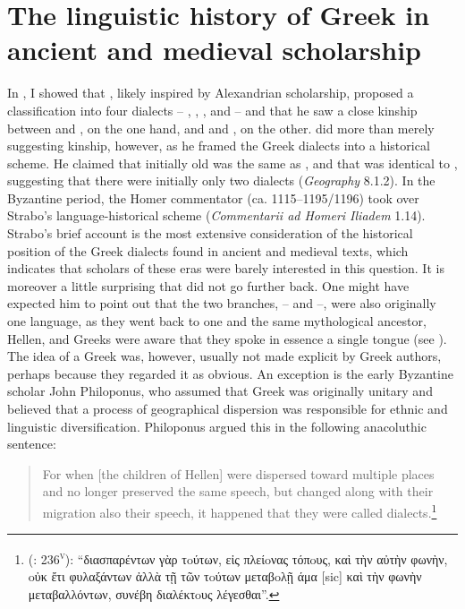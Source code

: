 \section{The linguistic history of Greek in ancient and medieval scholarship}\label{sec:5.1}

In , I showed that , likely inspired by Alexandrian scholarship, proposed a classification into four dialects – , , , and  – and that he saw a close kinship between  and , on the one hand, and  and , on the other.  did more than merely suggesting kinship, however, as he framed the Greek dialects into a historical scheme. He claimed that initially old  was the same as , and that  was identical to , suggesting that there were initially only two dialects (\textit{Geography} 8.1.2). In the Byzantine period, the Homer commentator  (ca. 1115–1195/1196) took over Strabo’s language-historical scheme (\textit{Commentarii ad Homeri Iliadem} 1.14). Strabo’s brief account is the most extensive consideration of the historical position of the Greek dialects found in ancient and medieval texts, which indicates that scholars of these eras were barely interested in this question. It is moreover a little surprising that  did not go further back. One might have expected him to point out that the two branches, – and –, were also originally one language, as they went back to one and the same mythological ancestor, Hellen, and Greeks were aware that they spoke in essence a single tongue (see \citealt{Morpurgo1987}). The idea of a Greek  was, however, usually not made explicit by Greek authors, perhaps because they regarded it as obvious. An exception is the early Byzantine scholar John Philoponus, who assumed that Greek was originally unitary and believed that a process of geographical dispersion was responsible for ethnic and linguistic diversification. Philoponus argued this in the following anacoluthic sentence:

\begin{quote}
For when [the children of Hellen] were dispersed toward multiple places and no longer preserved the same speech, but changed along with their migration also their speech, it happened that they were called dialects.\footnote{ (\citealt{Manutius1496Thesaurus}: 236\textsc{\textsuperscript{v}}): “διασπαρέντων γὰρ τoύτων, εἰς πλείoνας τόπoυς, καὶ τὴν αὐτὴν φωνὴν, oὐκ ἔτι φυλαξάντων\text{\textgreek{;}} ἀλλὰ τῇ τῶν τoύτων μεταβoλῇ άμα [sic] καὶ τὴν φωνὴν μεταβαλλόντων, συνέβη διαλέκτoυς λέγεσθαι”.}
\end{quote}


